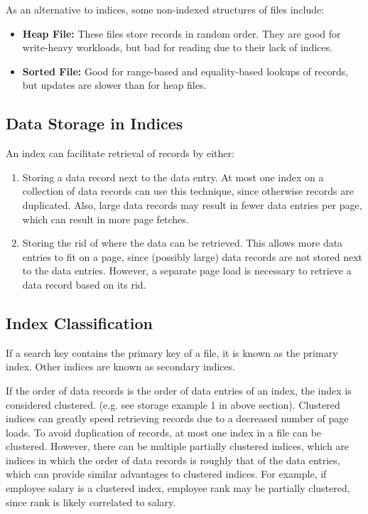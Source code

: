 \documentclass[12pt,titlepage]{article}
\begin{document}
      As an alternative to indices, some non-indexed structures of files include:
      \begin{itemize}
        \item \textbf{Heap File:} These files store records in random order. They are good for write-heavy workloads,
          but bad for reading due to their lack of indices.
        \item \textbf{Sorted File:} Good for range-based and equality-based lookups of records, but updates are slower
          than for heap files.
      \end{itemize}

    \subsection{Data Storage in Indices}
      An index can facilitate retrieval of records by either:
      \begin{enumerate}
        \item Storing a data record next to the data entry. At most one index on a collection of data records can use
          this technique, since otherwise records are duplicated. Also, large data records may result in fewer data entries
          per page, which can result in more page fetches.
        \item Storing the rid of where the data can be retrieved. This allows more data entries to fit on a page, since (possibly
          large) data records are not stored next to the data entries. However, a separate page load is necessary to retrieve
          a data record based on its rid.
      \end{enumerate}

    \subsection{Index Classification}
      If a search key contains the primary key of a file, it is known as the primary index. Other indices are known as secondary
      indices.

      If the order of data records is the order of data entries of an index, the index is considered clustered. (e.g. see storage
      example 1 in above section). Clustered indices can greatly speed retrieving records due to a decreased number of page loads.
      To avoid duplication of records, at most one index in a file can be clustered. However, there can be multiple partially
      clustered indices, which are indices in which the order of data records is roughly that of the data entries, which can provide
      similar advantages to clustered indices. For example, if employee salary is a clustered index, employee rank may be partially
      clustered, since rank is likely correlated to salary.
\end{document}
